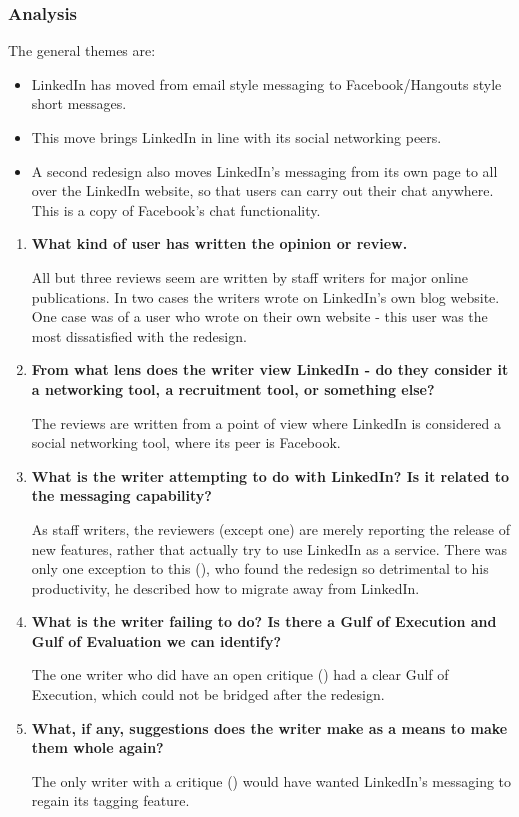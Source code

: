 \documentclass[
	letterpaper, %
]{jdf}
\begin{document}
\subsubsection{Analysis}

The general themes are:
\begin{itemize}
    \item LinkedIn has moved from email style messaging to Facebook/Hangouts style short messages. 
    \item This move brings LinkedIn in line with its social networking peers.
    \item A second redesign also moves LinkedIn's messaging from its own page to all over the LinkedIn website, so that users can carry out their chat anywhere. This is a copy of Facebook's chat functionality.
\end{itemize}


\begin{enumerate}
    \item \textbf{What kind of user has written the opinion or review.}
    
    All but three reviews seem are written by staff writers for major online publications. In two cases the writers wrote on LinkedIn's own blog website. One case was of a user who wrote on their own website - this user was the most dissatisfied with the redesign.
    
    \item \textbf{From what lens does the writer view LinkedIn - do they consider it a networking tool, a recruitment tool, or something else? }
    
    The reviews are written from a point of view where LinkedIn is considered a social networking tool, where its peer is Facebook.
    
    \item \textbf{What is the writer attempting to do with LinkedIn? Is it related to the messaging capability?}
    
    As staff writers, the reviewers (except one) are merely reporting the release of new features, rather that actually try to use LinkedIn as a service. There was only one exception to this (\cite{driskell_2017}), who found the redesign so detrimental to his productivity, he described how to migrate away from LinkedIn.
    
    \item\textbf{ What is the writer failing to do? Is there a Gulf of Execution and Gulf of Evaluation we can identify?}
    
    The one writer who did have an open critique (\cite{driskell_2017}) had a clear Gulf of Execution, which could not be bridged after the redesign.
    
    \item \textbf{What, if any, suggestions does the writer make as a means to make them whole again?}
    
    The only writer with a critique (\cite{driskell_2017}) would have wanted LinkedIn's messaging to regain its tagging feature.
\end{enumerate}
\end{document}
